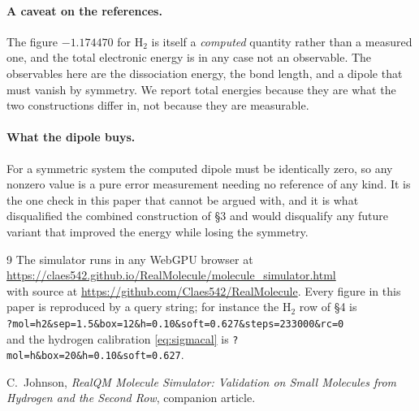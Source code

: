 \documentclass[11pt,a4paper]{article}
\begin{document}
\paragraph{A caveat on the references.} The figure $-1.174470$ for H$_2$ is itself a
\emph{computed} quantity rather than a measured one, and the total electronic energy is in any case
not an observable. The observables here are the
dissociation energy, the bond length, and a dipole that must vanish by symmetry. We report total
energies because they are what the two constructions differ in, not because they are measurable.

\paragraph{What the dipole buys.} For a symmetric system the computed dipole must be identically
zero, so any nonzero value is a pure error measurement needing no reference of any kind. It is the
one check in this paper that cannot be argued with, and it is what disqualified the combined
construction of \S3 and would disqualify any future variant that improved the energy while losing
the symmetry.


\begin{thebibliography}{9}
The simulator runs in any WebGPU browser at\\
\url{https://claes542.github.io/RealMolecule/molecule_simulator.html}\\
with source at \url{https://github.com/Claes542/RealMolecule}. Every figure in this paper is
reproduced by a query string; for instance the H$_2$ row of \S4 is\\
\texttt{?mol=h2\&sep=1.5\&box=12\&h=0.10\&soft=0.627\&steps=233000\&rc=0}\\
and the hydrogen calibration \eqref{eq:sigmacal} is \texttt{?mol=h\&box=20\&h=0.10\&soft=0.627}.

C.~Johnson,
\emph{RealQM Molecule Simulator: Validation on Small Molecules from Hydrogen and the Second Row},
companion article.
\end{thebibliography}
\end{document}
